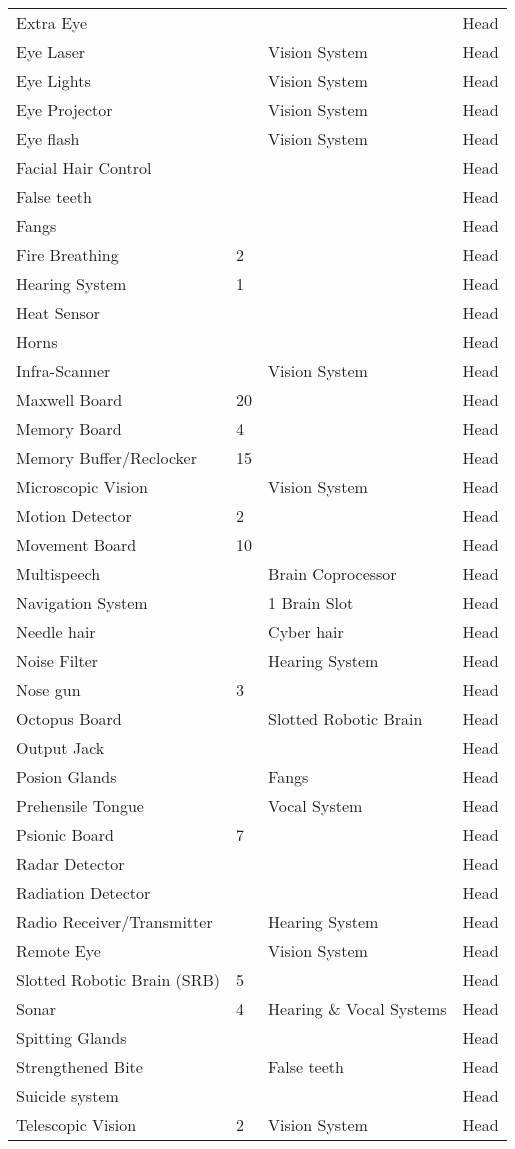 \documentclass[twoside]{book}
\begin{document}
\begin{longtable}{p{1.25in}p{2em}ll}
      \raggedright Extra Eye &&& Head \tabularnewline
      \raggedright Eye Laser && Vision System & Head \tabularnewline
      \raggedright Eye Lights && Vision System & Head \tabularnewline
      \raggedright Eye Projector && Vision System & Head \tabularnewline
      \raggedright Eye flash && Vision System & Head \tabularnewline
      \raggedright Facial Hair Control &&& Head \tabularnewline
      \raggedright False teeth &&& Head \tabularnewline
      \raggedright Fangs &&& Head \tabularnewline
      \raggedright Fire Breathing & 2 && Head \tabularnewline
      \raggedright Hearing System & 1 && Head \tabularnewline
      \raggedright Heat Sensor &&& Head \tabularnewline
      \raggedright Horns &&& Head \tabularnewline
      \raggedright Infra-Scanner && Vision System & Head \tabularnewline
      \raggedright Maxwell Board & 20 && Head \tabularnewline
      \raggedright Memory Board & 4 && Head \tabularnewline
      \raggedright Memory Buffer/Reclocker
           & 15 && Head \tabularnewline
      \raggedright Microscopic Vision && Vision System & Head \tabularnewline
      \raggedright Motion Detector & 2 && Head \tabularnewline
      \raggedright Movement Board & 10 && Head \tabularnewline
      \raggedright Multispeech && Brain Coprocessor
           & Head \tabularnewline
      \raggedright Navigation System && 1 Brain Slot & Head \tabularnewline
      \raggedright Needle hair && Cyber hair & Head \tabularnewline
      \raggedright Noise Filter && Hearing System & Head \tabularnewline
      \raggedright Nose gun & 3 && Head \tabularnewline
      \raggedright Octopus Board && Slotted Robotic Brain
           & Head \tabularnewline
      \raggedright Output Jack &&& Head \tabularnewline
      \raggedright Posion Glands && Fangs & Head \tabularnewline
      \raggedright Prehensile Tongue && Vocal System & Head \tabularnewline
      \raggedright Psionic Board & 7 && Head \tabularnewline
      \raggedright Radar Detector &&& Head \tabularnewline
      \raggedright Radiation Detector &&& Head \tabularnewline
      \raggedright Radio Receiver/Transmitter
           && Hearing System & Head \tabularnewline
      \raggedright Remote Eye && Vision System & Head \tabularnewline
      \raggedright Slotted Robotic Brain (SRB)
           & 5 && Head \tabularnewline
      \raggedright Sonar & 4 & Hearing \& Vocal
           Systems & Head \tabularnewline
      \raggedright Spitting Glands &&& Head \tabularnewline
      \raggedright Strengthened Bite && False teeth & Head \tabularnewline
      \raggedright Suicide system &&& Head \tabularnewline
      \raggedright Telescopic Vision & 2 & Vision System & Head \tabularnewline

\end{longtable}
\end{document}
